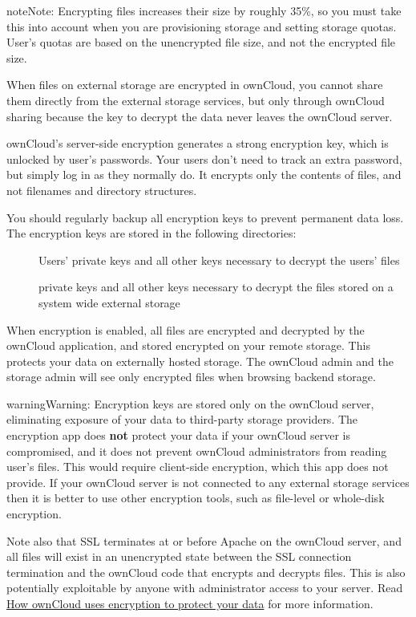 \documentclass[letterpaper,10pt,english]{sphinxmanual}
\begin{document}
\begin{notice}{note}{Note:}
Encrypting files increases their size by roughly 35\%, so you must
take this into account when you are provisioning storage and setting
storage quotas. User's quotas are based on the unencrypted file size, and
not the encrypted file size.
\end{notice}

When files on external storage are encrypted in ownCloud, you cannot share them
directly from the external storage services, but only through ownCloud sharing
because the key to decrypt the data never leaves the ownCloud server.

ownCloud's server-side encryption generates a strong encryption key, which is
unlocked by user's passwords. Your users don't need to track an extra
password, but simply log in as they normally do. It encrypts only the contents
of files, and not filenames and directory structures.

You should regularly backup all encryption keys to prevent permanent data loss.
The encryption keys are stored in the following directories:
\begin{description}
\item[{}] \leavevmode
Users' private keys and all other keys necessary to decrypt the users' files

\item[{}] \leavevmode
private keys and all other keys necessary to decrypt the files stored on a
system wide external storage

\end{description}

When encryption is enabled, all files are encrypted and decrypted by the
ownCloud application, and stored encrypted on your remote storage.
This protects your data on externally hosted storage. The ownCloud
admin and the storage admin will see only encrypted files when browsing backend
storage.

\begin{notice}{warning}{Warning:}
Encryption keys are stored only on the ownCloud server, eliminating
exposure of your data to third-party storage providers. The encryption app
does \textbf{not} protect your data if your ownCloud server is compromised, and it
does not prevent ownCloud administrators from reading user's files. This
would require client-side encryption, which this app does not provide. If
your ownCloud server is not connected to any external storage services then
it is better to use other encryption tools, such as file-level or
whole-disk encryption.

Note also that SSL terminates at or before Apache on the ownCloud server, and
all files will exist in an unencrypted state between the SSL connection
termination and the ownCloud code that encrypts and decrypts files. This is
also potentially exploitable by anyone with administrator access to your
server. Read \href{https://owncloud.org/blog/how-owncloud-uses-encryption-to-protect-your-data/}{How ownCloud uses encryption to protect your data} for more information.
\end{notice}
\end{document}
